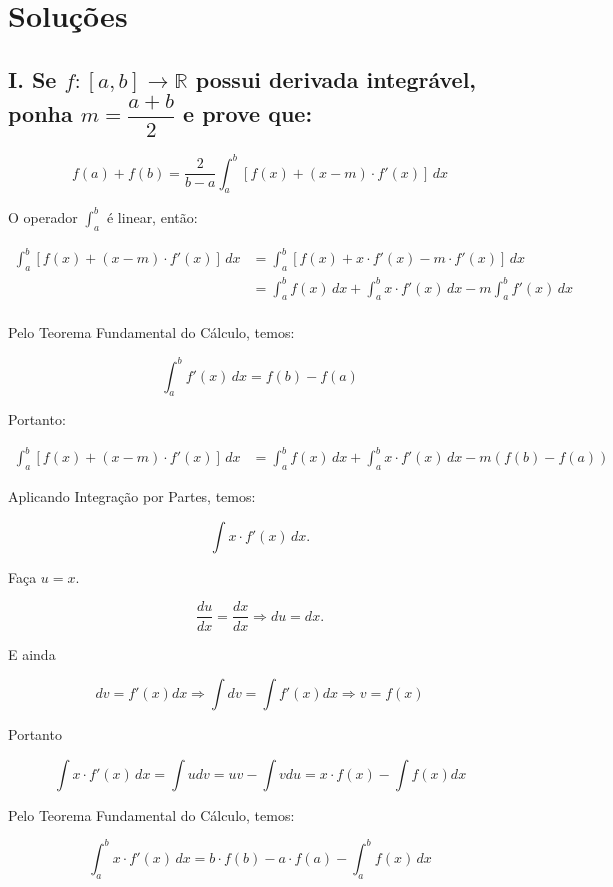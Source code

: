 \documentclass{article}
\begin{document}
\section*{Soluções}

\subsection*{
I. Se \(f:[a,b]\longrightarrow \mathbb{R} \) possui derivada integrável,
ponha \(m = \dfrac{a+b}{2}\) e prove que:
}
\[
    f(a) + f(b) =
    \dfrac{2}{b-a} \int_a^b [f(x) + (x-m) \cdot f'(x)] \, dx
\]

O operador \(\int_a^b\) é linear, então:

\begin{align*}
    \int_a^b [f(x) + (x-m) \cdot f'(x)] \, dx
     & = \int_a^b [f(x) + x \cdot f'(x) -m \cdot f'(x)] \, dx                        \\
     & = \int_a^b f(x) \, dx + \int_a^b x \cdot f'(x) \, dx - m \int_a^b f'(x) \, dx \\
\end{align*}

Pelo Teorema Fundamental do Cálculo, temos:

\begin{equation*}
    \int_a^b f'(x) \, dx = f(b) - f(a)
\end{equation*}

Portanto:

\begin{align}\label{eq:1}
    \int_a^b [f(x) + (x-m) \cdot f'(x)] \, dx
     & = \int_a^b f(x) \, dx + \int_a^b x \cdot f'(x) \, dx - m (f(b) - f(a))
\end{align}

Aplicando Integração por Partes, temos:

\[
    \int x \cdot f'(x) \, dx.
\]

Faça \(u = x\).

\[
    \dfrac{du}{dx} = \dfrac{dx}{dx} \Rightarrow  du = dx.
\]

E ainda

\[
    dv = f'(x) dx \Rightarrow \int dv = \int f'(x) dx
    \Rightarrow v = f(x)
\]

Portanto

\[
    \int x \cdot f'(x) \, dx = \int udv = uv - \int vdu = x \cdot f(x) - \int f(x) dx
\]

Pelo Teorema Fundamental do Cálculo, temos:

\[
    \int_a^b x \cdot f'(x) \, dx = b \cdot f(b) - a \cdot f(a) - \int_a^b f(x) \, dx
\]
\end{document}

